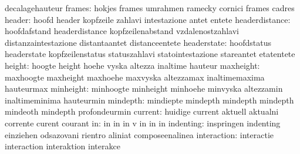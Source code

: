                            decalagehauteur
                   frames: hokjes                    frames
                           umrahmen                  ramecky
                           cornici                   frames
                           cadres
                   header: hoofd                     header
                           kopfzeile                 zahlavi
                           intestazione              antet
                           entete
           headerdistance: hoofdafstand              headerdistance
                           kopfzeilenabstand         vzdalenostzahlavi
                           distanzaintestazione      distantaantet
                           distanceentete
              headerstate: hoofdstatus               headerstate
                           kopfzeilenstatus          statuszahlavi
                           statointestazione         stareantet
                           etatentete
                   height: hoogte                    height
                           hoehe                     vyska
                           altezza                   inaltime
                           hauteur
                maxheight: maxhoogte                 maxheight
                           maxhoehe                  maxvyska
                           altezzamax                inaltimemaxima
                           hauteurmax
                minheight: minhoogte                 minheight
                           minhoehe                  minvyska
                           altezzamin                inaltimeminima
                           hauteurmin
                 mindepth: mindiepte                 mindepth
                           mindepth                  mindepth
                           mindeoth                  mindepth
                           profondeurmin
                  current: huidige                   current
                           aktuell                   aktualni
                           corrente                  curent
                           courant
                       in: in                        in
                           in                        v
                           in                        in
                           in
                indenting: inspringen                indenting
                           einziehen                 odsazovani
                           rientro                   aliniat
                           composeenalinea
              interaction: interactie                interaction
                           interaktion               interakce
